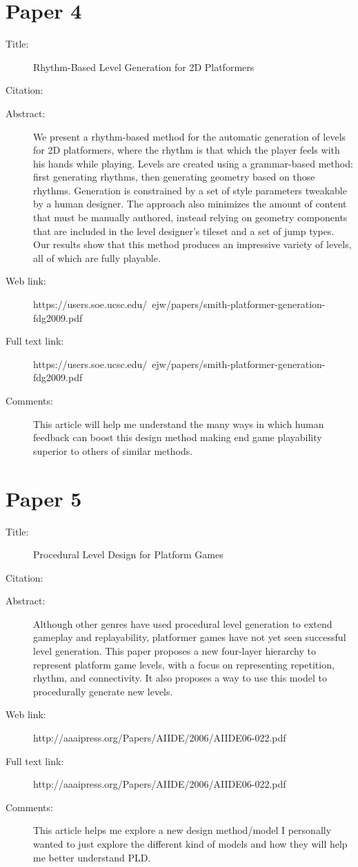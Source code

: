 \documentclass{scrartcl}
\begin{document}
\section*{Paper 4}
\begin{description}
\item[Title:] Rhythm-Based Level Generation for 2D Platformers 
\item[Citation:] \cite{RBLG}
\item[Abstract:] We present a rhythm-based method for the automatic generation
of levels for 2D platformers, where the rhythm is that which the
player feels with his hands while playing. Levels are created using
a grammar-based method: first generating rhythms, then
generating geometry based on those rhythms. Generation is
constrained by a set of style parameters tweakable by a human
designer. The approach also minimizes the amount of content that
must be manually authored, instead relying on geometry
components that are included in the level designer’s tileset and a
set of jump types. Our results show that this method produces an
impressive variety of levels, all of which are fully playable. 

\item[Web link:] https://users.soe.ucsc.edu/~ejw/papers/smith-platformer-generation-fdg2009.pdf
\item[Full text link:] https://users.soe.ucsc.edu/~ejw/papers/smith-platformer-generation-fdg2009.pdf
\item[Comments:] This article will help me understand the many ways in which human feedback can boost this design method making end game playability superior to others of similar methods.
\end{description}

\section*{Paper 5}
\begin{description}
\item[Title:] Procedural Level Design for Platform Games 
\item[Citation:] \cite{PLDPG}
\item[Abstract:] Although other genres have used procedural level
generation to extend gameplay and replayability, platformer
games have not yet seen successful level generation. This
paper proposes a new four-layer hierarchy to represent
platform game levels, with a focus on representing
repetition, rhythm, and connectivity. It also proposes a way
to use this model to procedurally generate new levels. 

\item[Web link:] http://aaaipress.org/Papers/AIIDE/2006/AIIDE06-022.pdf
\item[Full text link:] http://aaaipress.org/Papers/AIIDE/2006/AIIDE06-022.pdf
\item[Comments:] This article helps me explore a new design method/model I personally wanted to just explore the different kind of models and how they will help me better understand PLD.
\end{description}
\end{document}
